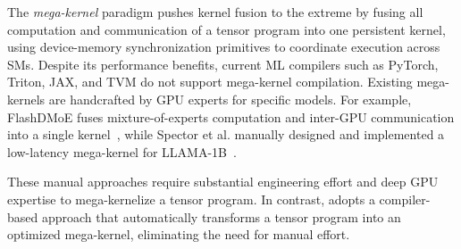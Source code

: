 
The {\em mega-kernel} paradigm pushes kernel fusion to the extreme by fusing all computation and communication of a tensor program into one persistent kernel, using device-memory synchronization primitives to coordinate execution across SMs. 
Despite its performance benefits, current ML compilers such as PyTorch, Triton, JAX, and TVM do not support mega-kernel compilation. Existing mega-kernels are handcrafted by GPU experts for specific models.
%
For example, FlashDMoE fuses mixture-of-experts computation and inter-GPU communication into a single kernel~\cite{aimuyo2025flashdmoe}, while Spector et al. manually designed and implemented a low-latency mega-kernel for LLAMA-1B~\cite{touvron2023llama,megakernel}. 

These manual approaches require substantial engineering effort and deep GPU expertise to mega-kernelize a tensor program. In contrast, \sys adopts a compiler-based approach that automatically transforms a tensor program into an optimized mega-kernel, eliminating the need for manual effort.

